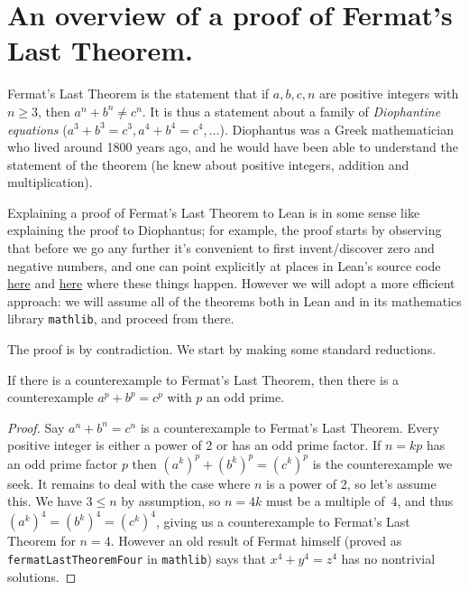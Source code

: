 \chapter{An overview of a proof of Fermat's Last Theorem.}

Fermat's Last Theorem is the statement that if $a,b,c,n$ are positive integers with $n\geq 3$, then $a^n+b^n\not=c^n$. It is thus a statement about a family of \emph{Diophantine equations} ($a^3+b^3=c^3, a^4+b^4=c^4,\ldots$). Diophantus was a Greek mathematician who lived around 1800 years ago, and he would have been able to understand the statement of the theorem (he knew about positive integers, addition and multiplication).

Explaining a proof of Fermat's Last Theorem to Lean is in some sense like explaining the proof to Diophantus; for example, the proof starts by observing that before we go any further it's convenient to first invent/discover zero and negative numbers, and one can point explicitly at places in Lean's source code \href{https://github.com/leanprover/lean4/blob/260eaebf4e804c9ac1319532970544a4e157c336/src/Init/Prelude.lean#L1049}{here} and \href{https://github.com/leanprover/lean4/blob/260eaebf4e804c9ac1319532970544a4e157c336/src/Init/Data/Int/Basic.lean#L45}{here} where these things happen. However we will adopt a more efficient approach: we will assume all of the theorems both in Lean and in its mathematics library {\tt mathlib}, and proceed from there.

The proof is by contradiction. We start by making some standard reductions.

\begin{lemma}\label{WLOG_n_prime}\leanok
  If there is a counterexample to Fermat's Last Theorem, then there is a counterexample $a^p+b^p=c^p$
  with $p$ an odd prime.
\end{lemma}
\begin{proof}\leanok
  Say $a^n + b^n = c^n$ is a counterexample to Fermat's Last Theorem. Every positive integer is either
  a power of 2 or has an odd prime factor. If $n=kp$ has an odd prime factor $p$ then
  $(a^k)^p+(b^k)^p=(c^k)^p$ is the counterexample we seek. It remains to deal with the case where
  $n$ is a power of 2, so let's assume this. We have $3\leq n$ by assumption, so
  $n=4k$ must be a multiple of~4, and thus $(a^k)^4=(b^k)^4=(c^k)^4$, giving us a counterexample
  to Fermat's Last Theorem for $n=4$. However an old result of Fermat himself (proved as {\tt fermatLastTheoremFour} in {\tt mathlib}) says that $x^4+y^4=z^4$ has no nontrivial solutions.
\end{proof}

